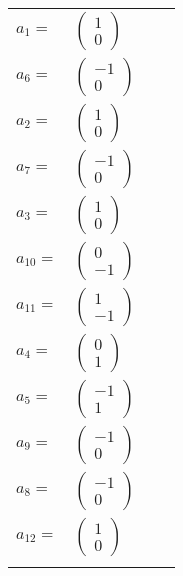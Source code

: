\documentclass[1p]{elsarticle_modified}
\theoremstyle{definition}
\begin{document}
\begin{tabular}{m{7pt} m{180pt} m{7pt} m{180pt} }
\flushright $a_{1}=$&$\begin{pmatrix}1\\0\end{pmatrix}$ \\
\flushright $a_{6}=$&$\begin{pmatrix}-1\\0\end{pmatrix}$ \\
\flushright $a_{2}=$&$\begin{pmatrix}1\\0\end{pmatrix}$ \\
\flushright $a_{7}=$&$\begin{pmatrix}-1\\0\end{pmatrix}$ \\
\flushright $a_{3}=$&$\begin{pmatrix}1\\0\end{pmatrix}$ \\
\flushright $a_{10}=$&$\begin{pmatrix}0\\-1\end{pmatrix}$ \\
\flushright $a_{11}=$&$\begin{pmatrix}1\\-1\end{pmatrix}$ \\
\flushright $a_{4}=$&$\begin{pmatrix}0\\1\end{pmatrix}$ \\
\flushright $a_{5}=$&$\begin{pmatrix}-1\\1\end{pmatrix}$ \\
\flushright $a_{9}=$&$\begin{pmatrix}-1\\0\end{pmatrix}$ \\
\flushright $a_{8}=$&$\begin{pmatrix}-1\\0\end{pmatrix}$ \\
\flushright $a_{12}=$&$\begin{pmatrix}1\\0\end{pmatrix}$\\&\end{tabular}
\end{document}
